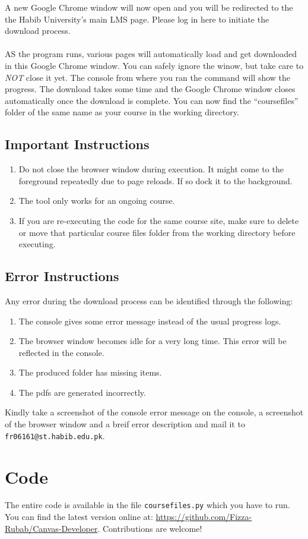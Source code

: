 \documentclass{article}
\begin{document}
A new Google Chrome window will now open and you will be redirected to
the the Habib University's main LMS page. Please log in here to initiate
the download process.
\\\\AS the program runs, various pages will automatically load and get
downloaded in this Google Chrome window. You can safely ignore the
winow, but take care to \emph{NOT} close it yet. The console from where
you ran the command will show the progress. The download takes some time
and the Google Chrome window closes automatically once the download is
complete. You can now find the ``coursefiles'' folder of the same name
as your course in the working directory.

\subsection{Important Instructions}

\begin{enumerate}
\def\labelenumi{\arabic{enumi}.}
\item
  Do not close the browser window during execution. It might come to the
  foreground repeatedly due to page reloads. If so dock it to the
  background.
\item
  The tool only works for an ongoing course.
  \item If you are re-executing the code for the same course site, make sure to delete or move that particular course files folder from the working directory before executing.
\end{enumerate}

\subsection{Error Instructions}
Any error during the download process can be identified through the
following:

\begin{enumerate}
\def\labelenumi{\arabic{enumi}.}
\item
  The console gives some error message instead of the usual progress
  logs.
\item
  The browser window becomes idle for a very long time. This error will
  be reflected in the console.
\item
  The produced folder has missing items.
\item
  The pdfs are generated incorrectly.
\end{enumerate}

Kindly take a screenshot of the console error message on the console, a
screenshot of the browser window and a breif error description and mail
it to \texttt{fr06161@st.habib.edu.pk}.

\section{Code}

The entire code is available in the file \texttt{coursefiles.py} which
you have to run. You can find the latest version online at:
\url{https://github.com/Fizza-Rubab/Canvas-Developer}. Contributions are
welcome!
\end{document}
